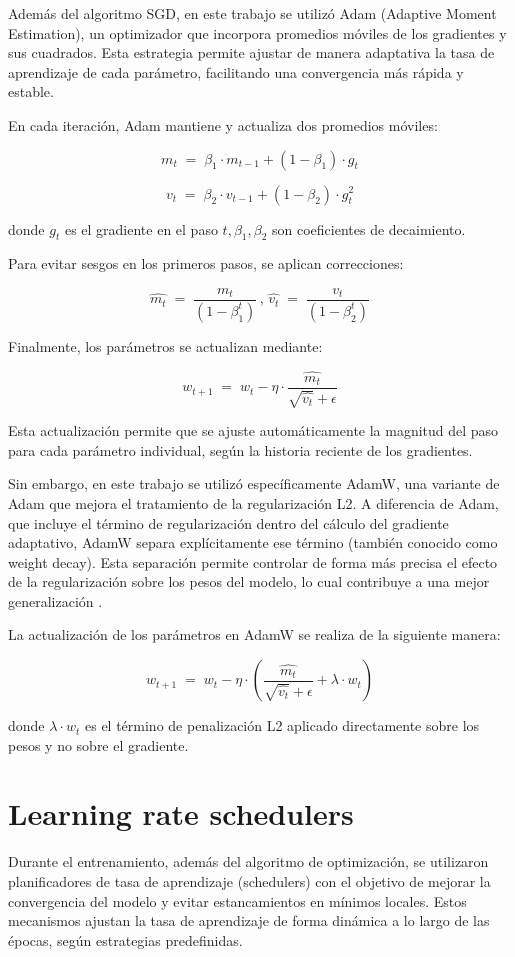 Además del algoritmo SGD, en este trabajo se utilizó Adam (Adaptive Moment Estimation), un optimizador que incorpora promedios móviles de los gradientes y sus cuadrados. Esta estrategia permite ajustar de manera adaptativa la tasa de aprendizaje de cada parámetro, facilitando una convergencia más rápida y estable.

En cada iteración, Adam mantiene y actualiza dos promedios móviles:

\[
m_t \;=\; \beta_1 \cdot m_{t-1} + (1 - \beta_1) \cdot g_t
\]

\[
v_t \;=\; \beta_2 \cdot v_{t-1} + (1 - \beta_2) \cdot g_t^2
\]

donde $g_t$ es el gradiente en el paso $t, \beta_1, \beta_2$ son coeficientes de decaimiento.

Para evitar sesgos en los primeros pasos, se aplican correcciones:

\[
\widehat{m_t} \;=\; \frac{m_t}{(1 - \beta_1^t)} \,,\, \widehat{v_t} \;=\; \frac{v_t}{(1 - \beta_2^t)}
\]

Finalmente, los parámetros se actualizan mediante:

\[
w_{t+1} \;=\; w_t - \eta \cdot \frac{\widehat{m_t}}{\sqrt{\widehat{v_t}} + \epsilon}
\]

Esta actualización permite que se ajuste automáticamente la magnitud del paso para cada parámetro individual, según la historia reciente de los gradientes.

Sin embargo, en este trabajo se utilizó específicamente AdamW, una variante de Adam que mejora el tratamiento de la regularización L2. A diferencia de Adam, que incluye el término de regularización dentro del cálculo del gradiente adaptativo, AdamW separa explícitamente ese término (también conocido como weight decay). Esta separación permite controlar de forma más precisa el efecto de la regularización sobre los pesos del modelo, lo cual contribuye a una mejor generalización \parencites{loshchilov2019decoupled}.

La actualización de los parámetros en AdamW se realiza de la siguiente manera:

\[
w_{t+1} \;=\; w_t - \eta \cdot (\frac{\widehat{m_t}}{\sqrt{\widehat{v_t}} + \epsilon} + \lambda \cdot w_t)
\]

donde $\lambda \cdot w_t$ es el término de penalización L2 aplicado directamente sobre los pesos y no sobre el gradiente.

\section{Learning rate schedulers}
Durante el entrenamiento, además del algoritmo de optimización, se utilizaron planificadores de tasa de aprendizaje (schedulers) con el objetivo de mejorar la convergencia del modelo y evitar estancamientos en mínimos locales. Estos mecanismos ajustan la tasa de aprendizaje de forma dinámica a lo largo de las épocas, según estrategias predefinidas.

